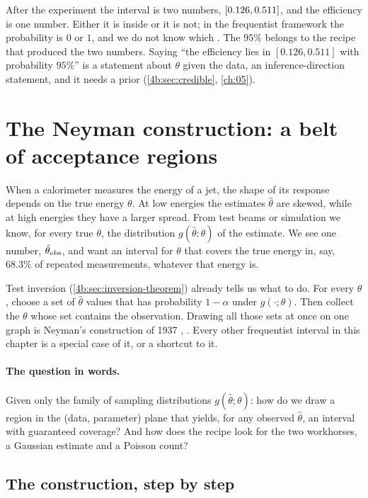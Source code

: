 \begin{pitfall}
After the experiment the interval is two numbers, $[0.126,0.511]$, and
the efficiency is one number. Either it is inside or it is not; in the
frequentist framework the probability is $0$ or $1$, and we do not know which
. The $95\%$ belongs to the recipe that produced the two
numbers. Saying ``the efficiency lies in $[0.126, 0.511]$ with probability
$95\%$'' is a statement about $\theta$ given the data, an inference-direction
statement, and it needs a prior (\cref{4b:sec:credible}, \cref{ch:05}).
\end{pitfall}
\section{The Neyman construction: a belt of acceptance regions}
\label{4b:sec:neyman}

When a calorimeter measures the energy of a jet, the shape of its response
depends on the true energy $\theta$. At low energies the estimates
$\hat\theta$ are skewed, while at high energies they have a larger spread. From test beams or simulation we know, for every true $\theta$, the
distribution $g(\hat\theta;\theta)$ of the estimate. We see one number,
$\hat\theta_{\rm obs}$, and want an interval for $\theta$ that covers the true
energy in, say, $68.3\%$ of repeated measurements, whatever that energy is.

Test inversion (\cref{4b:sec:inversion-theorem}) already tells us what to do.
For every $\theta$, choose a set of $\hat\theta$ values that has probability
$1-\alpha$ under $g(\cdot;\theta)$. Then collect the $\theta$ whose set contains
the observation. Drawing all those sets at once on one graph is Neyman's
construction of 1937 , \cite{FeldmanCousins1998}. Every
other frequentist interval in this chapter is a special case of it, or a
shortcut to it.

\paragraph{The question in words.}
Given only the family of sampling distributions $g(\hat\theta;\theta)$:
how do we draw a region in the (data, parameter) plane that yields, for any
observed $\hat\theta$, an interval with guaranteed coverage? And how does the
recipe look for the two workhorses, a Gaussian estimate and a Poisson count?

\subsection{The construction, step by step}
\label{4b:sec:belt}

